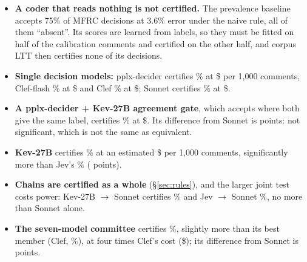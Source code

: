 \begin{itemize}
  \item \textbf{A coder that reads nothing is not certified.} The prevalence baseline accepts 75\% of MFRC decisions at 3.6\%
  error under the naive rule, all of them ``absent''. Its scores are learned from labels, so they must be fitted on half of
  the calibration comments and certified on the other half, and corpus LTT then certifies none of its decisions.
  \item \textbf{Single decision models:} pplx-decider certifies \% at
  \$ per 1,000 comments, Clef-flash \% at
  \$ and Clef \% at \$; Sonnet certifies
  \% at \$.
  \item \textbf{A pplx-decider + Kev-27B agreement gate}, which accepts where both give the same label, certifies
  \% at \$. Its difference from Sonnet is
   points: not significant, which is not the same as equivalent.
  \item \textbf{Kev-27B} certifies \% at an estimated \$ per 1,000
  comments, significantly more than Jev's \% ( points).
  \item \textbf{Chains are certified as a whole} (\S\ref{sec:rules}), and the larger joint test costs power: Kev-27B
  $\rightarrow$ Sonnet certifies \% and Jev $\rightarrow$ Sonnet
  \%, no more than Sonnet alone.
  \item \textbf{The seven-model committee} certifies \%, slightly more than its best member
  (Clef, \%), at four times Clef's cost (\$); its difference from
  Sonnet is  points.
\end{itemize}

